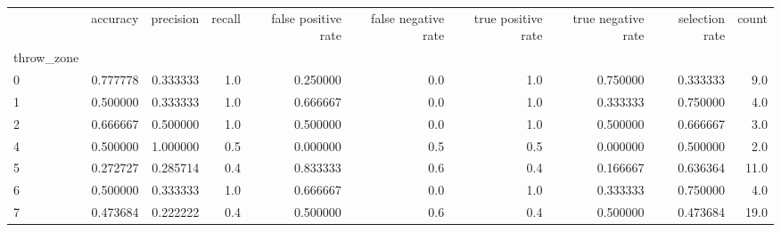 \begin{tabular}{lrrrrrrrrr}
\toprule
{} &  accuracy &  precision &  recall &  false positive rate &  false negative rate &  true positive rate &  true negative rate &  selection rate &  count \\
throw\_zone &           &            &         &                      &                      &                     &                     &                 &        \\
\midrule
0          &  0.777778 &   0.333333 &     1.0 &             0.250000 &                  0.0 &                 1.0 &            0.750000 &        0.333333 &    9.0 \\
1          &  0.500000 &   0.333333 &     1.0 &             0.666667 &                  0.0 &                 1.0 &            0.333333 &        0.750000 &    4.0 \\
2          &  0.666667 &   0.500000 &     1.0 &             0.500000 &                  0.0 &                 1.0 &            0.500000 &        0.666667 &    3.0 \\
4          &  0.500000 &   1.000000 &     0.5 &             0.000000 &                  0.5 &                 0.5 &            0.000000 &        0.500000 &    2.0 \\
5          &  0.272727 &   0.285714 &     0.4 &             0.833333 &                  0.6 &                 0.4 &            0.166667 &        0.636364 &   11.0 \\
6          &  0.500000 &   0.333333 &     1.0 &             0.666667 &                  0.0 &                 1.0 &            0.333333 &        0.750000 &    4.0 \\
7          &  0.473684 &   0.222222 &     0.4 &             0.500000 &                  0.6 &                 0.4 &            0.500000 &        0.473684 &   19.0 \\
\bottomrule
\end{tabular}

